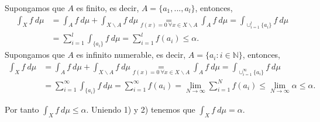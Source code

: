 \begin{ejemplo}
\begin{enumerate}
              Supongamos que $A$ es finito, es decir, $A = \{a_1,...,a_l\}$, entonces,
              \begin{align*}
                  \int_{X}{f \ d\mu} & = \int_{A}{f \ d\mu} + \int_{X \backslash A}{f \ d\mu} \underset{f(x) = 0 \ \forall x \in X \backslash A}{=} \int_{A}{f \ d\mu} = \int_{\cup_{i=1}^{l}{\{a_i\}}}{{f \ d\mu}} \\
                                     & = \sum_{i=1}^{l}{\int_{\{a_i\}}{f \ d\mu}} = \sum_{i=1}^{l}{f(a_i)} \leq \alpha.
              \end{align*}
              Supongamos que $A$ es infinito numerable, es decir, $A = \{a_i : i \in \mathbb{N}\}$, entonces,
              \begin{align*}
                  \int_{X}{f \ d\mu} & = \int_{A}{f \ d\mu} + \int_{X \backslash A}{f \ d\mu} \underset{f(x) = 0 \ \forall x \in X \backslash A}{=} \int_{A}{f \ d\mu} = \int_{\cup_{i=1}^{\infty}{\{a_i\}}}{{f \ d\mu}} \\
                                     & = \sum_{i=1}^{\infty}{\int_{\{a_i\}}{f \ d\mu}} = \sum_{i=1}^{\infty}{f(a_i)} = \lim_{N \to \infty}{\sum_{i=1}^{N}{f(a_i)}} \leq \lim_{N \to \infty}{\alpha} \leq \alpha.
              \end{align*}
    \end{enumerate}
    Por tanto $\int_{X}{f \ d\mu} \leq \alpha$. Uniendo 1) y 2) tenemos que $\int_{X}{f \ d\mu} = \alpha$.
\end{ejemplo}


